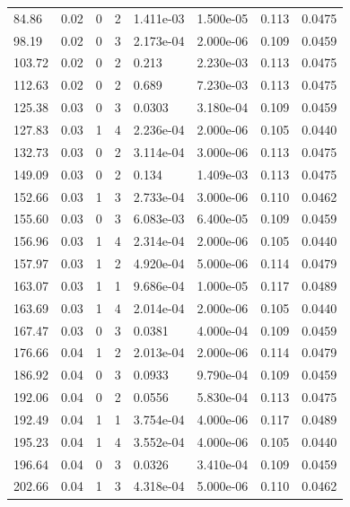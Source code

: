 \documentclass[preview]{standalone}
\begin{document}
{{\begin{tabular}{L{1.2cm}C{1.2cm} C{0.3cm}C{0.5cm} C{1.4cm}C{1.4cm} C{1.4cm}C{1.4cm}}
  84.86  &  0.02  & 0     &  2 &  1.411e-03  & 1.500e-05  & 0.113 &  0.0475   \\ 
  98.19  &  0.02  & 0     &  3 &  2.173e-04  & 2.000e-06  & 0.109 &  0.0459   \\ 
  103.72  &  0.02  & 0     &  2 &  0.213  & 2.230e-03  & 0.113 &  0.0475   \\ 
  112.63  &  0.02  & 0     &  2 &  0.689  & 7.230e-03  & 0.113 &  0.0475   \\ 
  125.38  &  0.03  & 0     &  3 &  0.0303  & 3.180e-04  & 0.109 &  0.0459   \\ 
  127.83  &  0.03  & 1     &  4 &  2.236e-04  & 2.000e-06  & 0.105 &  0.0440   \\ 
  132.73  &  0.03  & 0     &  2 &  3.114e-04  & 3.000e-06  & 0.113 &  0.0475   \\ 
  149.09  &  0.03  & 0     &  2 &  0.134  & 1.409e-03  & 0.113 &  0.0475   \\ 
  152.66  &  0.03  & 1     &  3 &  2.733e-04  & 3.000e-06  & 0.110 &  0.0462   \\ 
  155.60  &  0.03  & 0     &  3 &  6.083e-03  & 6.400e-05  & 0.109 &  0.0459   \\ 
  156.96  &  0.03  & 1     &  4 &  2.314e-04  & 2.000e-06  & 0.105 &  0.0440   \\ 
  157.97  &  0.03  & 1     &  2 &  4.920e-04  & 5.000e-06  & 0.114 &  0.0479   \\ 
  163.07  &  0.03  & 1     &  1 &  9.686e-04  & 1.000e-05  & 0.117 &  0.0489   \\ 
  163.69  &  0.03  & 1     &  4 &  2.014e-04  & 2.000e-06  & 0.105 &  0.0440   \\ 
  167.47  &  0.03  & 0     &  3 &  0.0381  & 4.000e-04  & 0.109 &  0.0459   \\ 
  176.66  &  0.04  & 1     &  2 &  2.013e-04  & 2.000e-06  & 0.114 &  0.0479   \\ 
  186.92  &  0.04  & 0     &  3 &  0.0933  & 9.790e-04  & 0.109 &  0.0459   \\ 
  192.06  &  0.04  & 0     &  2 &  0.0556  & 5.830e-04  & 0.113 &  0.0475   \\ 
  192.49  &  0.04  & 1     &  1 &  3.754e-04  & 4.000e-06  & 0.117 &  0.0489   \\ 
  195.23  &  0.04  & 1     &  4 &  3.552e-04  & 4.000e-06  & 0.105 &  0.0440   \\ 
  196.64  &  0.04  & 0     &  3 &  0.0326  & 3.410e-04  & 0.109 &  0.0459   \\ 
  202.66  &  0.04  & 1     &  3 &  4.318e-04  & 5.000e-06  & 0.110 &  0.0462   \\ 

\end{tabular}}}
\end{document}
